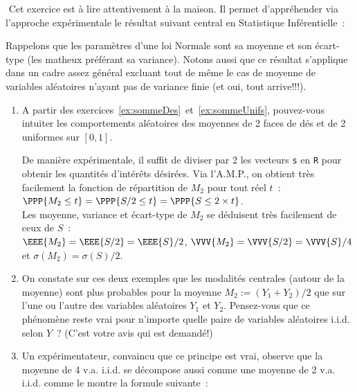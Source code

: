 \documentclass[10pt]{report}
\begin{document}
\begin{exercice} ${ }$\label{ex:loiMoyenne}
Cet exercice est à lire attentivement à la maison. Il permet d'appréhender via l'approche expérimentale le résultat suivant central en Statistique Inférentielle~:
\begin{center}
\end{center}
Rappelons que les paramètres d'une loi Normale sont sa moyenne et son écart-type (les matheux préférant sa variance). Notons aussi que ce résultat s'applique dans un cadre assez général excluant tout de même le cas de moyenne de variables aléatoires n'ayant pas de variance finie (et oui, tout arrive!!!).
\begin{enumerate}
\item A partir des exercices~\ref{ex:sommeDes}~et~\ref{ex:sommeUnifs}, pouvez-vous intuiter les comportements aléatoires des moyennes de 2 faces de dés et de 2 uniformes sur $[0,1]$.\\
\begin{Correction}
De manière expérimentale, il suffit de diviser par  2 les vecteurs \texttt{s} en \texttt{R} pour obtenir les quantités d'intérêts désirées. Via l'A.M.P., on obtient très facilement la fonction de répartition de $M_2$ pour tout réel $t$~: $\PPP{M_2 \leq t}=\PPP{S/2 \leq t}=\PPP{S\leq 2\times t}$.\\
Les moyenne, variance et écart-type de $M_2$ se déduisent très facilement de ceux de $S$~:\\
$\EEE{M_2}=\EEE{S/2}=\EEE{S}/2$, $\VVV{M_2}=\VVV{S/2}=\VVV{S}/4$ et $\sigma(M_2)=\sigma(S)/2$.
\end{Correction}
\item On constate sur ces deux exemples que les modalités centrales (autour de la moyenne) sont plus probables pour la moyenne $M_2:=(Y_1+Y_2)/2$ que sur l'une ou l'autre des variables aléatoires $Y_1$ et $Y_2$.  Pensez-vous que ce phénomène reste vrai pour n'importe quelle paire de variables aléatoires  i.i.d. selon $Y$~? (C'est votre avis qui est demandé!)
\item Un expérimentateur, convaincu que ce principe est vrai, observe que la moyenne de 4 v.a. i.i.d. se décompose aussi comme une moyenne de 2 v.a. i.i.d. comme le montre la formule suivante~:

\end{enumerate}
\end{exercice}
\end{document}
